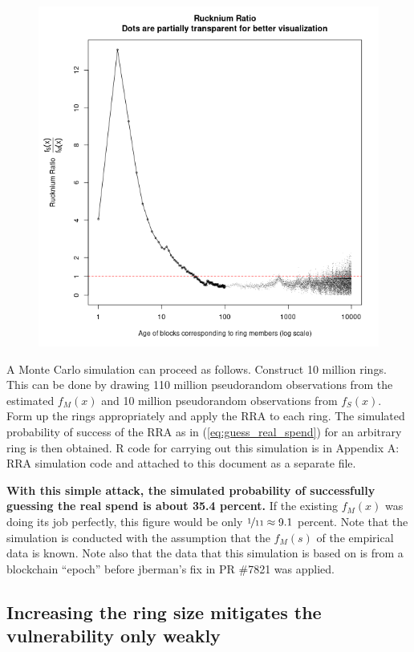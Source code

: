 \documentclass[english]{paper}
\begin{document}
\begin{figure}
\caption{}

\includegraphics[scale=0.75]{images/Rucknium-Ratio}
\end{figure}

A Monte Carlo simulation can proceed as follows. Construct 10 million
rings. This can be done by drawing 110 million pseudorandom observations
from the estimated $f_{M}(x)$ and 10 million pseudorandom observations
from $f_{S}(x)$. Form up the rings appropriately and apply the RRA
to each ring. The simulated probability of success of the RRA as in
(\ref{eq:guess_real_spend}) for an arbitrary ring is then obtained.
R code for carrying out this simulation is in Appendix A: RRA simulation
code and attached to this document as a separate file.

\textbf{With this simple attack, the simulated probability of successfully
guessing the real spend is about 35.4 percent.} If the existing $f_{M}(x)$
was doing its job perfectly, this figure would be only $\nicefrac{1}{11}\approx9.1$
percent. Note that the simulation is conducted with the assumption
that the $f_{M}(s)$ of the empirical data is known. Note also that
the data that this simulation is based on is from a blockchain ``epoch''
before jberman's fix in PR \#7821 was applied.

\subsection{Increasing the ring size mitigates the vulnerability only weakly}
\end{document}
